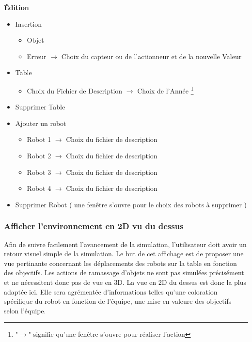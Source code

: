 \textbf{\'Edition}
\begin{itemize}
\item Insertion
    \begin{itemize}
    \item Objet
    \item Erreur $\rightarrow$ Choix du capteur ou de l'actionneur et de la nouvelle Valeur
    \end{itemize}

\item Table
\begin{itemize}
\item {Choix du Fichier de Description $\rightarrow$ Choix de l'Année} \footnote{"$\rightarrow$" signifie qu'une fenêtre s'ouvre pour réaliser l'action}
\end{itemize}
\item Supprimer Table

\item Ajouter un robot
    \begin{itemize}
    \item Robot 1 $\rightarrow$ Choix du fichier de description
    \item Robot 2 $\rightarrow$ Choix du fichier de description
    \item Robot 3 $\rightarrow$ Choix du fichier de description
    \item Robot 4 $\rightarrow$ Choix du fichier de description
    \end{itemize}
\item Supprimer Robot ( une fenêtre s'ouvre pour le choix des robots à supprimer )
\end{itemize}

    

\subsubsection{Afficher l'environnement en 2D vu du dessus}
Afin de suivre facilement l'avancement de la simulation, l'utilisateur doit avoir un retour visuel simple de la simulation. Le but de cet affichage est de proposer une vue pertinante concernant les déplacements des robots sur la table en fonction des objectifs. Les actions de ramassage d'objets ne sont pas simulées précisément et ne nécessitent donc pas de vue en 3D.
La vue en 2D du dessus est donc la plus adaptée ici. Elle sera agrémentée d'informations telles qu'une coloration spécifique du robot en fonction de l'équipe, une mise en valeure des objectifs selon l'équipe.

